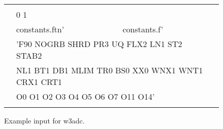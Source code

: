 \setlength{\unitlength}{0.1mm}

\begin{figure}

\begin{center} {\code \begin{tabular}{|cllc|} \hline
 & & &  \\
 & \multicolumn{2}{l}{0 1}        & \\ 
 & constants.ftn' & constants.f'  & \\
 & \multicolumn{2}{l}{'F90 NOGRB SHRD PR3 UQ FLX2 LN1 ST2 STAB2}& \\
 & \multicolumn{2}{l}{\strut\hspace{5mm} NL1 BT1 DB1 MLIM TR0 BS0 XX0 WNX1 WNT1 CRX1 CRT1 }& \\
 & \multicolumn{2}{l}{\strut\hspace{5mm} O0 O1 O2 O3 O4 O5 O6 O7 O11 O14'}& \\
 &               &             & \\ \hline
\end{tabular} } \end{center} 
\caption{Example input for {\F w3adc}.} \label{fig:w3adc}

\botline
\end{figure}
